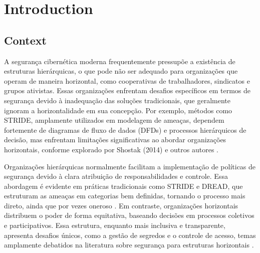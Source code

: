 %
%





\chapter{Introduction}
\label{cha:introduction}

\section{Context}
\label{sec:context}


A segurança cibernética moderna frequentemente pressupõe a existência de
estruturas hierárquicas, o que pode não ser adequado para organizações que
operam de maneira horizontal, como cooperativas de trabalhadores, sindicatos e
grupos ativistas. Essas organizações enfrentam desafios específicos em termos de
segurança devido à inadequação das soluções tradicionais, que geralmente ignoram
a horizontalidade em sua concepção. Por exemplo, métodos como STRIDE, amplamente
utilizados em modelagem de ameaças, dependem fortemente de diagramas de fluxo de
dados (DFDs) e processos hierárquicos de decisão, mas enfrentam limitações
significativas ao abordar organizações horizontais, conforme explorado por
Shostak (2014) e outros autores \cite{ThreatModelingASystematicLiteratureReview,
AHybridThreatModelingMethod, ThreatModellingSurvey}.

Organizações hierárquicas normalmente facilitam a implementação de políticas de
segurança devido à clara atribuição de responsabilidades e controle. Essa
abordagem é evidente em práticas tradicionais como STRIDE e DREAD, que
estruturam as ameaças em categorias bem definidas, tornando o processo mais
direto, ainda que por vezes oneroso \cite{ExperiencesThreatModelingAtMicrosoft,
ThreatModellingSurvey, DemystifyingTheThreatModelingProcess}.
Em contraste, organizações horizontais distribuem o poder de forma
equitativa, baseando decisões em processos coletivos e participativos.
Essa estrutura, enquanto mais inclusiva e transparente, apresenta
desafios únicos, como a gestão de segredos e o controle de acesso,
temas amplamente debatidos na literatura sobre segurança para estruturas
horizontais \cite{Colbac, ParticipatoryThreatModelling, CoReTM}.

